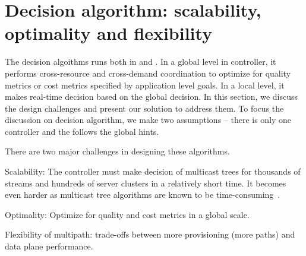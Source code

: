 \begin{comment}
\section{Fault tolerance}

We consider two types of failure models. 

\section{Controller consistency}

\begin{itemize}
	\item Inconsistency of multiple versions of same controller: formulate the problem, introduce the solution
	\item Inconsistency of different controllers: formulate the problem, introduce the solution
\end{itemize}
\end{comment}




\section{Decision algorithm: scalability, optimality and flexibility}

The decision algoithms runs both in \localControl and \globalControl. In a global level in controller, it performs cross-resource and cross-demand coordination to optimize for quality metrics or cost metrics specified by application level goals. In a local level, it makes real-time decision based on the global decision. In this section, we discuss the design challenges and present our solution to address them. To focus the discussion on decision algorithm, we make two assumptions -- there is only one controller and the \localControl follows the global hints. 

There are two major challenges in designing these algorithms.
\begin{packeditemize}
	\item Scalability: The controller must make decision of multicast trees for thousands of streams and hundreds of server clusters in a relatively short time. It becomes even harder as multicast tree algorithms are known to be time-consuming~\cite{?}.
	\item Optimality: Optimize for quality and cost metrics in a global scale.
	\item Flexibility of multipath: trade-offs between more provisioning (more paths) and data plane performance.
\end{packeditemize}

